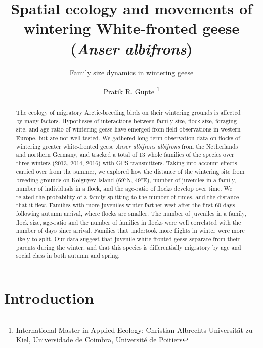 \documentclass[10pt,twocolumn]{paper}
\title{Spatial ecology and movements of wintering White-fronted geese
(\emph{Anser albifrons})}
\subtitle{Family size dynamics in wintering geese}
\author{Pratik R. Gupte \thanks{International Master in Applied Ecology: Christian-Albrechts-Universit\"{a}t zu Kiel, Universidade de Coimbra, Universit\'{e} de Poitiers}}
\date{}
\begin{document}
\maketitle
\begin{abstract}
The ecology of migratory Arctic-breeding birds on their wintering
grounds is affected by many factors. Hypotheses of interactions between
family size, flock size, foraging site, and age-ratio of wintering geese
have emerged from field observations in western Europe, but are not well
tested. We gathered long-term observation data on flocks of wintering
greater white-fronted geese \emph{Anser albifrons albifrons} from the
Netherlands and northern Germany, and tracked a total of 13 whole
families of the species over three winters (2013, 2014, 2016) with GPS
transmitters. Taking into account effects carried over from the summer,
we explored how the distance of the wintering site from breeding grounds
on Kolguyev Island (69°N, 49°E), number of juveniles in a family, number
of individuals in a flock, and the age-ratio of flocks develop over
time. We related the probability of a family splitting to the number of
times, and the distance that it flew. Families with more juveniles
winter farther west after the first 60 days following autumn arrival,
where flocks are smaller. The number of juveniles in a family, flock
size, age-ratio and the number of families in flocks were well
correlated with the number of days since arrival. Families that
undertook more flights in winter were more likely to split. Our data
suggest that juvenile white-fronted geese separate from their parents
during the winter, and that this species is differentially migratory by
age and social class in both autumn and spring.
\end{abstract}

\renewcommand\dblfloatpagefraction{.95} %
\renewcommand\dbltopfraction{.95} %
\renewcommand\bottomfraction{.9}
\renewcommand\textfraction{.1}

\setcounter{totalnumber}{50} \setcounter{topnumber}{50}
\setcounter{bottomnumber}{10} \setlength{\textfloatsep}{5pt}
\setlength{\floatsep}{5pt}

\section{Introduction}\label{introduction}
\end{document}
